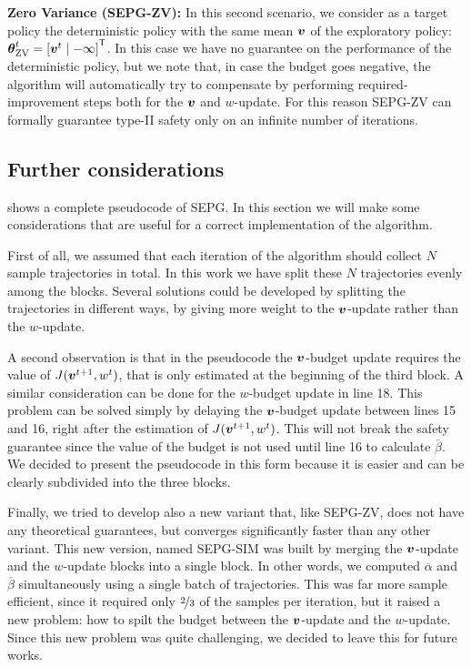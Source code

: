 \textbf{Zero Variance (SEPG-ZV):} In this second scenario, we consider as a target policy the deterministic policy with the same mean $\boldsymbol{v}$ of the exploratory policy: ${\boldsymbol{\theta}}^t_{\text{ZV}} = {[\boldsymbol{v}^t \mid -\infty]}^{\mathsf{T}}$. In this case we have no guarantee on the performance of the deterministic policy, but we note that, in case the budget goes negative, the algorithm will automatically  try to compensate by performing required-improvement steps both for the $\boldsymbol{v}$ and $w$-update. For this reason SEPG-ZV can formally guarantee type-II safety only on an infinite number of iterations. 




\subsection{Further considerations}
 shows a complete pseudocode of SEPG. In this section we will make some considerations that are useful for a correct implementation of the algorithm.

First of all, we assumed that each iteration of the algorithm should collect $N$ sample trajectories in total. In this work we have split these $N$ trajectories evenly among the blocks. Several solutions could be developed by splitting the trajectories in different ways, \eg by giving more weight to the $\boldsymbol{v}$-update rather than the $w$-update.

A second observation is that in the pseudocode the $\boldsymbol{v}$-budget update requires the value of $J(\boldsymbol{v}^{t+1}, w^t)$, that is only estimated at the beginning of the third block. A similar consideration can be done for the $w$-budget update in line 18. This problem can be solved simply by delaying the $\boldsymbol{v}$-budget update between lines 15 and 16, right after the estimation of $J(\boldsymbol{v}^{t+1}, w^t)$. This will not break the safety guarantee since the value of the budget is not used until line 16 to calculate $\overline{\beta}$. We decided to present the pseudocode in this form because it is easier and can be clearly subdivided into the three blocks.

Finally, we tried to develop also a new variant that, like SEPG-ZV, does not have any theoretical guarantees, but converges significantly faster than any other variant. This new version, named SEPG-SIM was built by merging the $\boldsymbol{v}$-update and the $w$-update blocks into a single block. In other words, we computed $\overline{\alpha}$ and $\overline{\beta}$ simultaneously using a single batch of trajectories. This was far more sample efficient, since it required only $\nicefrac{2}{3}$ of the samples per iteration, but it raised a new problem: how to spilt the budget between the $\boldsymbol{v}$-update and the $w$-update. Since this new problem was quite challenging, we decided to leave this for future works.


